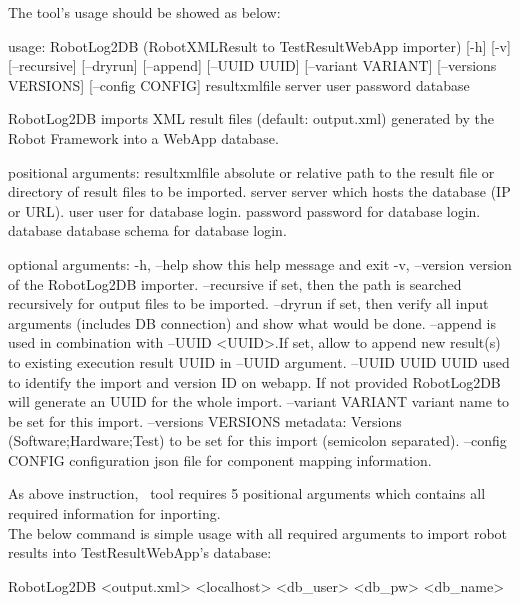 The tool's usage should be showed as below:
\begin{robotlog}
usage: RobotLog2DB (RobotXMLResult to TestResultWebApp importer) [-h] [-v] 
                   [--recursive] [--dryrun] [--append] [--UUID UUID] 
                   [--variant VARIANT] [--versions VERSIONS] [--config CONFIG]
                   resultxmlfile server user password database

RobotLog2DB imports XML result files (default: output.xml) generated by the Robot Framework 
                     into a WebApp database.

positional arguments:
resultxmlfile        absolute or relative path to the result file or directory of result
                     files to be imported.
server               server which hosts the database (IP or URL).
user                 user for database login.
password             password for database login.
database             database schema for database login.

optional arguments:
-h, --help           show this help message and exit
-v, --version        version of the RobotLog2DB importer.
--recursive          if set, then the path is searched recursively for output files to be 
                     imported.
--dryrun             if set, then verify all input arguments (includes DB connection) and 
                     show what would be done.
--append             is used in combination with --UUID <UUID>.If set, allow to append new 
                     result(s) to existing execution result UUID in --UUID argument.
--UUID UUID          UUID used to identify the import and version ID on webapp. 
                     If not provided RobotLog2DB will generate an UUID for the whole import.
--variant VARIANT    variant name to be set for this import.
--versions VERSIONS  metadata: Versions (Software;Hardware;Test) to be set for this import 
                     (semicolon separated).
--config CONFIG      configuration json file for component mapping information.
\end{robotlog}

As above instruction, \pkg\ tool requires 5 positional arguments which contains all required
information for inporting.\\
The below command is simple usage with all required arguments to import robot results into 
TestResultWebApp's database:
\begin{robotlog}
RobotLog2DB <output.xml> <localhost> <db\_user> <db\_pw> <db\_name>
\end{robotlog}


